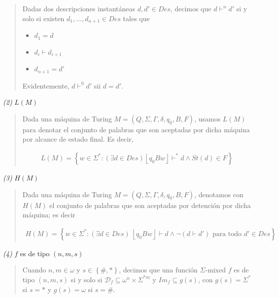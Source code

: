 \documentclass[a4paper, 12pt]{article}
\begin{document}
\small
\begin{quote}

Dadas dos descripciones instantáneas $d, d' \in Des$, decimos que $d \vdash^n
d'$ si y solo si existen $d_1, \ldots, d_{n+1} \in Des$ tales que 

\begin{itemize}
    \item $d_1 = d$ 
    \item $d_i \vdash d_{i+1}$ 
    \item $d_{n+1} = d'$
\end{itemize}

Evidentemente, $d \vdash^0 d'$ sii $d = d'$.



\end{quote}
\normalsize

\textit{(2)} $L(M)$


\small
\begin{quote}

Dada una máquina de Turing $M = (Q, \Sigma, \Gamma, \delta, q_0, B, F)$, usamos
$L(M)$ para denotar el conjunto de palabras que son aceptadas por dicha máquina
por alcance de estado final. Es decir, 

\begin{align*}
    L(M) = \left\{ w \in \Sigma^{*} : (\exists d \in Des) \left\lfloor q_0Bw \right\rfloor
    \vdash^{*} d \land St(d) \in F\right\} 
\end{align*}

\end{quote}
\normalsize

\textit{(3)} $H(M)$


\small
\begin{quote}

Dada una máquina de Turing $M = (Q, \Sigma, \Gamma, \delta, q_0, B, F)$,
denotamos con $H(M)$ el conjunto de palabras que son aceptadas por detención por
dicha máquina; es decir 

\begin{align*}
    H(M) = \left\{ w \in \Sigma^{*} : (\exists d \in Des) ~ \left\lfloor q_0 B w
    \right\rfloor \vdash d \land \neg(d \vdash d') \text{ para todo } d' \in Des \right\} 
\end{align*}

\end{quote}
\normalsize

\textit{(4)} $f$ es de tipo $(n, m, s)$


\small
\begin{quote}

Cuando $n, m \in \omega$ y $s \in \left\{ \#, * \right\} $, decimos
que una función $\Sigma$-mixed $f$ es de tipo $(n, m, s)$ si y solo si
$\mathcal{D}_f \subseteq \omega^{n} \times \Sigma^{*m} $ y $Im_{f} \subseteq
g(s)$, con $g(s) = \Sigma^{*}$ si $s = *$ y $g(s) = \omega$ si $s = \#$.

\end{quote}
\normalsize
\end{document}
